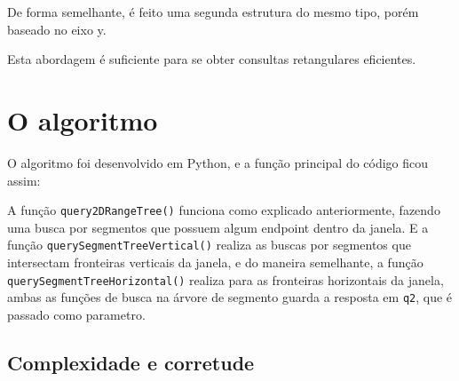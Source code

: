 \documentclass{article}
\theoremstyle{definition}
\begin{document}
De forma semelhante, é feito uma segunda estrutura do mesmo tipo, porém baseado no eixo y.

\hspace*{15pt} Esta abordagem é suficiente para se obter consultas retangulares eficientes.

\section{O algoritmo}
\hspace*{15pt} O algoritmo foi desenvolvido em Python, e a função principal do código 
ficou assim:

\hspace*{15pt} A função \texttt{query2DRangeTree()} funciona como
explicado anteriormente, fazendo uma busca por segmentos que possuem
algum endpoint dentro da janela. E a função \texttt{querySegmentTreeVertical()}
realiza as buscas por segmentos que intersectam fronteiras verticais
da janela, e do maneira semelhante, a função  \texttt{querySegmentTreeHorizontal()}
realiza para as fronteiras horizontais da janela, ambas as funções de 
busca na árvore de segmento guarda a resposta em \texttt{q2}, que é passado
como parametro.
\newpage
\subsection{Complexidade e corretude}
\newpage


\end{document}
